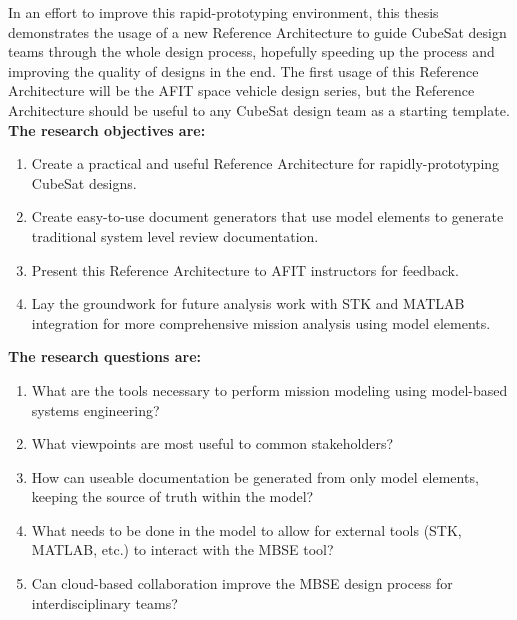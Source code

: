 In an effort to improve this rapid-prototyping environment, this thesis demonstrates the usage of a new Reference Architecture to guide CubeSat design teams through the whole design process, hopefully speeding up the process and improving the quality of designs in the end. The first usage of this Reference Architecture will be the AFIT space vehicle design series, but the Reference Architecture should be useful to any CubeSat design team as a starting template. \\

\noindent \textbf{The research objectives are:}

\begin{enumerate}
\item{Create a practical and useful Reference Architecture for rapidly-prototyping CubeSat designs.}
\item{Create easy-to-use document generators that use model elements to generate traditional system level review documentation.}
\item{Present this Reference Architecture to AFIT instructors for feedback.}
\item{Lay the groundwork for future analysis work with STK and MATLAB integration for more comprehensive mission analysis using model elements.}
\end{enumerate}

\noindent \textbf{The research questions are:}

\begin{enumerate}
\item{What are the tools necessary to perform mission modeling using model-based systems engineering?}
\item{What viewpoints are most useful to common stakeholders?}
\item{How can useable documentation be generated from only model elements, keeping the source of truth within the model?}
\item{What needs to be done in the model to allow for external tools (STK, MATLAB, etc.) to interact with the MBSE tool?}
\item{Can cloud-based collaboration improve the MBSE design process for interdisciplinary teams?}

\end{enumerate}
